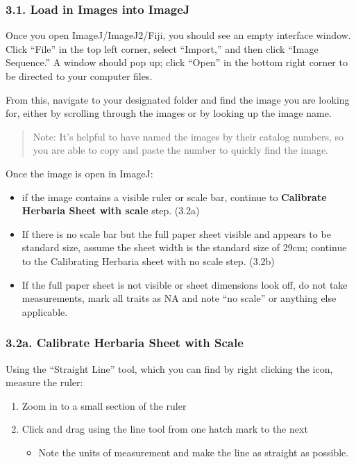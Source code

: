 \documentclass[
]{article}
\providecommand{\tightlist}{%
  \setlength{\itemsep}{0pt}\setlength{\parskip}{0pt}}
\begin{document}
\subsubsection{3.1. Load in Images into
ImageJ}\label{load-in-images-into-imagej}

Once you open ImageJ/ImageJ2/Fiji, you should see an empty interface
window. Click ``File'' in the top left corner, select ``Import,'' and
then click ``Image Sequence.'' A window should pop up; click ``Open'' in
the bottom right corner to be directed to your computer files.

From this, navigate to your designated folder and find the image you are
looking for, either by scrolling through the images or by looking up the
image name.

\begin{quote}
Note: It's helpful to have named the images by their catalog numbers, so
you are able to copy and paste the number to quickly find the image.
\end{quote}

Once the image is open in ImageJ:

\begin{itemize}
\tightlist
\item
  if the image contains a visible ruler or scale bar, continue to
  \textbf{Calibrate Herbaria Sheet with scale} step. (3.2a)
\item
  If there is no scale bar but the full paper sheet visible and appears
  to be standard size, assume the sheet width is the standard size of
  29cm; continue to the Calibrating Herbaria sheet with no scale step.
  (3.2b)
\item
  If the full paper sheet is not visible or sheet dimensions look off,
  do not take measurements, mark all traits as NA and note ``no scale''
  or anything else applicable.
\end{itemize}

\subsubsection{3.2a. Calibrate Herbaria Sheet with
Scale}\label{a.-calibrate-herbaria-sheet-with-scale}

Using the ``Straight Line'' tool, which you can find by right clicking
the icon, measure the ruler:

\begin{enumerate}
\def\labelenumi{\arabic{enumi}.}
\tightlist
\item
  Zoom in to a small section of the ruler
\item
  Click and drag using the line tool from one hatch mark to the next

  \begin{itemize}
  \tightlist
  \item
    Note the units of measurement and make the line as straight as
    possible.
  \end{itemize}
\end{enumerate}
\end{document}
